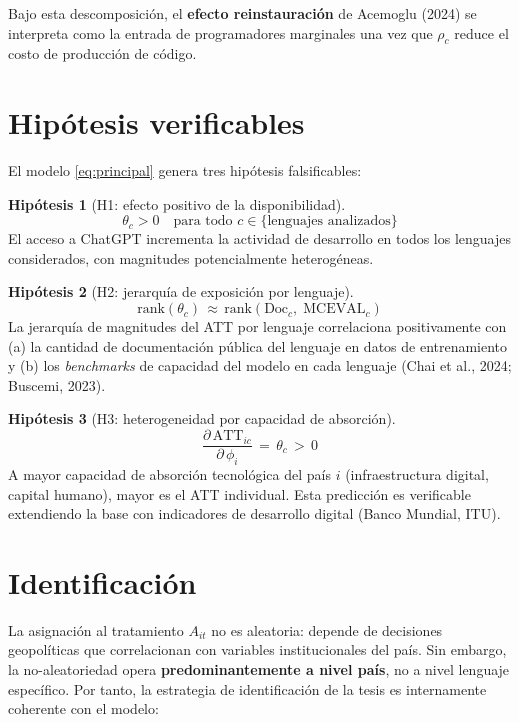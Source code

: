 \documentclass[11pt,a4paper]{article}
\theoremstyle{definition}
\newtheorem*{hipotesis}{Hipótesis}
\begin{document}
Bajo esta descomposición, el \textbf{efecto reinstauración} de Acemoglu (2024) se interpreta como la entrada de programadores marginales una vez que $\rho_c$ reduce el costo de producción de código.

\section{Hipótesis verificables}
\label{sec:hipotesis}

El modelo \eqref{eq:principal} genera tres hipótesis falsificables:

\begin{hipotesis}[H1: efecto positivo de la disponibilidad]
\[
\theta_c > 0 \quad \text{para todo } c \in \{\text{lenguajes analizados}\}
\]
El acceso a ChatGPT incrementa la actividad de desarrollo en todos los lenguajes considerados, con magnitudes potencialmente heterogéneas.
\end{hipotesis}

\begin{hipotesis}[H2: jerarquía de exposición por lenguaje]
\[
\text{rank}(\theta_c) \,\approx\, \text{rank}\!\left(\text{Doc}_c,\;\text{MCEVAL}_c\right)
\]
La jerarquía de magnitudes del ATT por lenguaje correlaciona positivamente con (a) la cantidad de documentación pública del lenguaje en datos de entrenamiento y (b) los \textit{benchmarks} de capacidad del modelo en cada lenguaje (Chai et al., 2024; Buscemi, 2023).
\end{hipotesis}

\begin{hipotesis}[H3: heterogeneidad por capacidad de absorción]
\[
\frac{\partial\, \text{ATT}_{ic}}{\partial\, \phi_i} \,=\, \theta_c \,>\, 0
\]
A mayor capacidad de absorción tecnológica del país $i$ (infraestructura digital, capital humano), mayor es el ATT individual. Esta predicción es verificable extendiendo la base con indicadores de desarrollo digital (Banco Mundial, ITU).
\end{hipotesis}

\section{Identificación}

La asignación al tratamiento $A_{it}$ no es aleatoria: depende de decisiones geopolíticas que correlacionan con variables institucionales del país. Sin embargo, la no-aleatoriedad opera \textbf{predominantemente a nivel país}, no a nivel lenguaje específico. Por tanto, la estrategia de identificación de la tesis es internamente coherente con el modelo:
\end{document}
